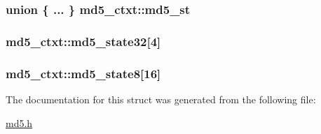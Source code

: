 \hypertarget{structmd5__ctxt_a146b2c7717909a02905a63c19afbb964}{
\subsubsection[{md5\-\_\-st}]{\setlength{\rightskip}{0pt plus 5cm}union \{ ... \} 			 md5\-\_\-ctxt\-::md5\-\_\-st}}\label{structmd5__ctxt_a146b2c7717909a02905a63c19afbb964}
\hypertarget{structmd5__ctxt_a79eaaa7daf441c0716ca44d54cf2f528}{
\subsubsection[{md5\-\_\-state32}]{ md5\-\_\-ctxt\-::md5\-\_\-state32\mbox{[}4\mbox{]}}}\label{structmd5__ctxt_a79eaaa7daf441c0716ca44d54cf2f528}
\hypertarget{structmd5__ctxt_a7be28cf899bb2c8105106369665b9400}{
\subsubsection[{md5\-\_\-state8}]{ md5\-\_\-ctxt\-::md5\-\_\-state8\mbox{[}16\mbox{]}}}\label{structmd5__ctxt_a7be28cf899bb2c8105106369665b9400}


The documentation for this struct was generated from the following file\-:\begin{DoxyCompactItemize}
\item 
\hyperlink{md5_8h}{md5.\-h}\end{DoxyCompactItemize}
